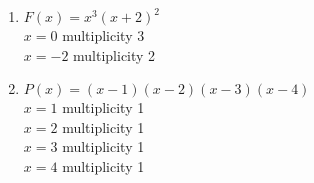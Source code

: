 \documentclass{ximera}
\begin{document}
\begin{multicols}{2}
\begin{enumerate}
\setcounter{enumi}{\value{HW}}

\item $F(x) = x^{3}(x + 2)^{2}$\\
$x = 0$ multiplicity 3\\
$x = -2$ multiplicity 2\\


\vfill

\columnbreak

\item $P(x) = (x - 1)(x - 2)(x - 3)(x - 4)$\\
$x = 1$ multiplicity 1\\
$x = 2$ multiplicity 1\\
$x = 3$ multiplicity 1\\
$x = 4$ multiplicity 1\\


\setcounter{HW}{\value{enumi}}
\end{enumerate}
\end{multicols}
\end{document}

